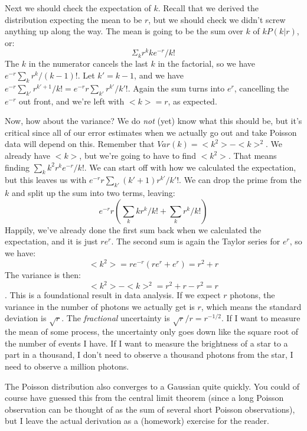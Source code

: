 \documentclass[letterpaper,11pt,preprint]{aastex}
\begin{document}
Next we should check the expectation of $k$.  Recall that we derived
the distribution expecting the mean to be $r$, but we should check we
didn't screw anything up along the way.  The mean is going to be the
sum over $k$ of $kP(k|r)$, or:
$$\Sigma_k r^k k e^{-r}/k!$$
The $k$ in the numerator cancels the last $k$ in the factorial, so we
have $e^{-r}\sum_k r^k/(k-1)!$.  Let $k'=k-1$, and we
have $e^{-r}\sum_{k'} r^{k'+1}/k! = e^{-r}r\sum_{k'}r^{k'}/k'!$.
Again the sum turns into $e^r$, cancelling the $e^{-r}$ out front, and
we're left with $<k>=r$, as expected.

Now, how about the variance?  We do {\textit{not}} (yet) know what
this should be, but it's critical since all of our error estimates
when we actually go out and take Poisson data will depend on this.
Remember that $Var(k)=<k^2>-<k>^2$.  We already have $<k>$, but we're
going to have to find $<k^2>$.  That means finding $\sum_k
k^2r^ke^{-r}/k!$.  We can start off with how we calculated the
expectation, but this leaves us with $e^{-r}r \sum_{k'}
(k'+1)r^{k'}/k'!$.  
We can drop the prime from the $k$ and split up the sum into two
terms, leaving:
$$e^{-r}r\left (\sum_k kr^k/k! + \sum_k r^k/k! \right )$$
Happily, we've already done the first sum back when we calculated the
expectation, and it is just $re^r$.  The second sum is again the
Taylor series for $e^r$, so we have:
$$<k^2>=re^{-r}(re^r+e^r) = r^2+r$$
The variance is then:
$$<k^2>-<k>^2=r^2+r-r^2=r$$.
This is a foundational result in data analysis.  If we expect $r$
photons, the variance in the number of photons we actually get is $r$,
which means the standard deviation is $\sqrt{r}$.  The
{\textit{fractional}} uncertainty is $\sqrt{r}/r=r^{-1/2}$.  If I want
to measure the mean of some process, the uncertainty only goes down
like the square root of the number of events I have.  If I want to
measure the brightness of a star to a part in a thousand, I don't need to
observe a thousand photons from the star, I need to observe a million
photons.

The Poisson distribution also converges to a Gaussian quite quickly.
You could of course have guessed this from the central limit theorem
(since a long Poisson observation can be thought of as the sum of
several short Poisson observations), but I leave the actual derivation
as a (homework) exercise for the reader.
\end{document}
